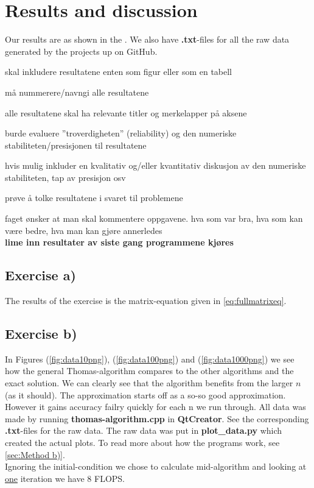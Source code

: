 \documentclass{article}
\begin{document}
\vspace{1cm}

\section{Results and discussion} \label{Results}

  Our results are as shown in the . We also have \textbf{.txt}-files for all the raw data generated by the projects up on GitHub.

  skal inkludere resultatene enten som figur eller som en tabell

  må nummerere/navngi alle resultatene

  alle resultatene skal ha relevante titler og merkelapper på aksene

  burde evaluere ''troverdigheten'' (reliability) og den numeriske stabiliteten/presisjonen til resultatene

  hvis mulig inkluder en kvalitativ og/eller kvantitativ diskusjon av den numeriske stabiliteten, tap av presisjon osv

  prøve å tolke resultatene i svaret til problemene

  faget ønsker at man skal kommentere oppgavene. hva som var bra, hva som kan være bedre, hva man kan gjøre annerledes \\

  {\bf lime inn resultater av siste gang programmene kjøres} \\

  \subsection{Exercise a)} \label{Results a)}

  The results of the exercise is the matrix-equation given in \ref{eq:fullmatrixeq}.

  \subsection{Exercise b)} \label{Results b)}

  In Figures (\ref{fig:data10png}), (\ref{fig:data100png}) and (\ref{fig:data1000png}) we see how the general Thomas-algorithm compares to the other algorithms and the exact solution. We can clearly see that the algorithm benefits from the larger $n$ (as it should). The approximation starts off as a so-so good approximation. However it gains accuracy failry quickly for each n we run through. All data was made by running \textbf{thomas-algorithm.cpp} in \textbf{QtCreator}. See the corresponding \textbf{.txt}-files for the raw data. The raw data was put in \textbf{plot\_data.py} which created the actual plots. To read more about how the programs work, see
  \ref{sec:Method b)}.\\
  Ignoring the initial-condition we chose to calculate mid-algorithm and looking at \underline{one} iteration we have 8 FLOPS.
\end{document}
